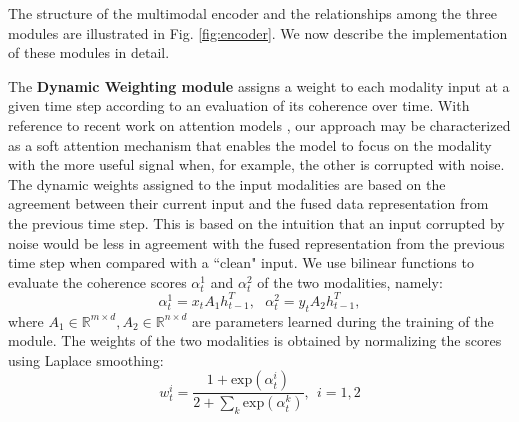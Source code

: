 \documentclass[10pt,twocolumn,letterpaper]{article}
\begin{document}
The structure of the multimodal encoder and the relationships among the three modules are illustrated in Fig. \ref{fig:encoder}. We now describe the implementation of these modules in detail.
%
%
%

The \textbf{Dynamic Weighting module} assigns a weight to each modality input at a given time step according to an evaluation of its coherence over time. With reference to recent work on attention models \cite{BahdanauCB14}, our approach may be characterized as a soft attention mechanism that enables the model to focus on the modality with the more useful signal when, for example, the other is corrupted with noise. The dynamic weights assigned to the input modalities are based on the agreement between their current input and the fused data representation from the previous time step. This is based on the intuition that an input corrupted by noise would be less in agreement with the fused representation from the previous time step when compared with a ``clean" input. We use bilinear functions to evaluate the coherence scores $\alpha_t^1$ and $\alpha_t^2$ of the two modalities, namely:
%
%
%
$$\alpha_t^1 = x_t A_1 h_{t-1}^T,\ \ \  \alpha_t^2 = y_t A_2 h_{t-1}^T,$$
where $A_1 \in \mathbb{R}^{m\times d}, A_2 \in \mathbb{R}^{n\times d}$ are parameters learned during the training of the module. The weights of the two modalities is obtained by normalizing the scores using Laplace smoothing:
$$w_t^i = \frac{1 + \text{exp}(\alpha_t^i)}{2 + \sum_k \text{exp}(\alpha_t^k)}, \ \ i=1,2 $$

\end{document}
